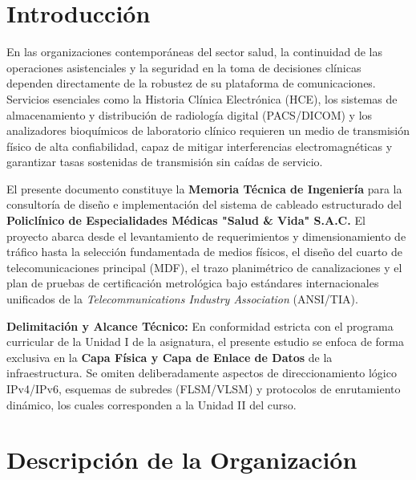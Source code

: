 \documentclass[11pt,a4paper]{article}
\begin{document}
\thispagestyle{empty}
\tableofcontents
\newpage
\setcounter{page}{1}

\section{Introducción}

En las organizaciones contemporáneas del sector salud, la continuidad de las operaciones asistenciales y la seguridad en la toma de decisiones clínicas dependen directamente de la robustez de su plataforma de comunicaciones. Servicios esenciales como la Historia Clínica Electrónica (HCE), los sistemas de almacenamiento y distribución de radiología digital (PACS/DICOM) y los analizadores bioquímicos de laboratorio clínico requieren un medio de transmisión físico de alta confiabilidad, capaz de mitigar interferencias electromagnéticas y garantizar tasas sostenidas de transmisión sin caídas de servicio.

El presente documento constituye la \textbf{Memoria Técnica de Ingeniería} para la consultoría de diseño e implementación del sistema de cableado estructurado del \textbf{Policlínico de Especialidades Médicas "Salud \& Vida" S.A.C.} El proyecto abarca desde el levantamiento de requerimientos y dimensionamiento de tráfico hasta la selección fundamentada de medios físicos, el diseño del cuarto de telecomunicaciones principal (MDF), el trazo planimétrico de canalizaciones y el plan de pruebas de certificación metrológica bajo estándares internacionales unificados de la \textit{Telecommunications Industry Association} (ANSI/TIA).

\textbf{Delimitación y Alcance Técnico:} En conformidad estricta con el programa curricular de la Unidad I de la asignatura, el presente estudio se enfoca de forma exclusiva en la \textbf{Capa Física y Capa de Enlace de Datos} de la infraestructura. Se omiten deliberadamente aspectos de direccionamiento lógico IPv4/IPv6, esquemas de subredes (FLSM/VLSM) y protocolos de enrutamiento dinámico, los cuales corresponden a la Unidad II del curso.

\section{Descripción de la Organización}
\end{document}
